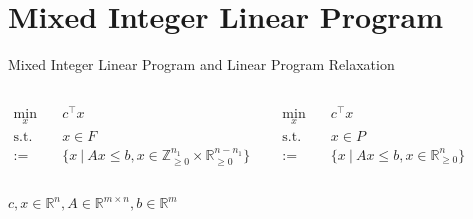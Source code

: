 \section{Mixed Integer Linear Program}

\begin{frame}{Mixed Integer Linear Program and Linear Program Relaxation}
\small
\begin{columns}

	\begin{tcolorbox}[colback=white, title={MILP (standard form)}]
    \begin{align*}
    	\min_{x}\quad &c^\top x \\
    	\text{s.t.}\quad & x\in F \\
    	:= &\{x \:\vert\: Ax \leq b, x \in \mathbb{Z}_{\geq 0}^{n_1} \times \mathbb{R}_{\geq 0}^{n-n_1} \}
    \end{align*}
    \end{tcolorbox}

	\begin{tcolorbox}[colback=white, title={LP Relaxation}]
    \begin{align*}
    	\min_{x}\quad &c^\top x \\
    	\text{s.t.}\quad &x \in P\\
    	:= &\{x \:\vert\: Ax \leq b, x \in \mathbb{R}_{\geq 0}^{n}\}
    \end{align*}
    \end{tcolorbox}
\end{columns}
$c,x \in \mathbb{R}^n, A \in \mathbb{R}^{m \times n}, b \in \mathbb{R}^m$
\end{frame}


